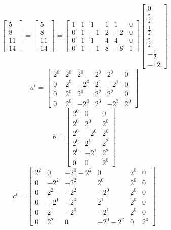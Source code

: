 \documentclass{article}%
\begin{document}
\[%
\left[\begin{matrix}5\\8\\11\\14\end{matrix}\right] = \left[\begin{matrix}5\\8\\11\\14\end{matrix}\right] = \left[\begin{matrix}1 & 1 & 1 & 1 & 1 & 0\\0 & 1 & -1 & 2 & -2 & 0\\0 & 1 & 1 & 4 & 4 & 0\\0 & 1 & -1 & 8 & -8 & 1\end{matrix}\right] \left[\begin{matrix}0\\\frac{5}{2}\\\frac{1}{2}\\\frac{5}{2}\\- \frac{1}{2}\\-12\end{matrix}\right]%
\]%
\[%
a^{t} = \left[\begin{matrix}2^{0} & 2^{0} & 2^{0} & 2^{0} & 2^{0} & 0\\0 & 2^{0} & - 2^{0} & 2^{1} & - 2^{1} & 0\\0 & 2^{0} & 2^{0} & 2^{2} & 2^{2} & 0\\0 & 2^{0} & - 2^{0} & 2^{3} & - 2^{3} & 2^{0}\end{matrix}\right]%
\]%
\[%
b = \left[\begin{matrix}2^{0} & 0 & 0\\2^{0} & 2^{0} & 2^{0}\\2^{0} & - 2^{0} & 2^{0}\\2^{0} & 2^{1} & 2^{2}\\2^{0} & - 2^{1} & 2^{2}\\0 & 0 & 2^{0}\end{matrix}\right]%
\]%
\[%
c^{t} = \left[\begin{matrix}2^{2} & 0 & - 2^{0} - 2^{2} & 0 & 2^{0} & 0\\0 & - 2^{2} & - 2^{2} & 2^{0} & 2^{0} & 0\\0 & 2^{2} & - 2^{2} & - 2^{0} & 2^{0} & 0\\0 & - 2^{1} & - 2^{0} & 2^{1} & 2^{0} & 0\\0 & 2^{1} & - 2^{0} & - 2^{1} & 2^{0} & 0\\0 & 2^{2} & 0 & - 2^{0} - 2^{2} & 0 & 2^{0}\end{matrix}\right]%
\]%
\end{document}

